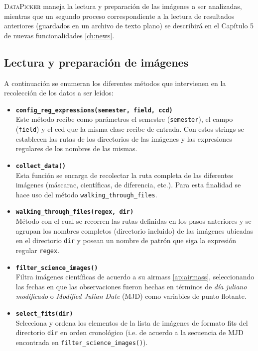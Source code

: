 \textsc{DataPicker} maneja  la lectura y preparaci\'on de las im\'agenes a ser analizadas, mientras que un segundo proceso correspondiente a la lectura de resultados anteriores (guardados en un archivo de texto plano) se describir\'a en el Cap\'itulo 5 de nuevas funcionalidades \ref{ch:news}. 
\bigskip
  
\subsection{Lectura y preparaci\'on de im\'agenes}
A continuaci\'on se enumeran los diferentes m\'etodos que intervienen en la recolecci\'on de los datos a ser le\'idos:

\begin{itemize}
\item \textbf{\texttt{config\_reg\_expressions(semester, field, ccd)}}\\
Este m\'etodo recibe como par\'ametros el semestre (\texttt{semester}), el campo (\texttt{field}) y el ccd que la misma clase recibe de entrada. Con estos strings se establecen las rutas de los directorios de las im\'agenes y las expresiones regulares de los nombres de las mismas.
\bigskip

\item \textbf{\texttt{collect\_data()}}\\
Esta funci\'on se encarga de recolectar la ruta completa de las diferentes im\'agenes (m\'ascarac, cient\'ificas, de diferencia, etc.). Para esta finalidad se hace uso del m\'etodo \texttt{walking\_through\_files}. 
\bigskip

\item \textbf{\texttt{walking\_through\_files(regex, dir)}}\\
M\'etodo con el cual se recorren las rutas definidas en los pasos anteriores y se agrupan los nombres completos (directorio incluido) de las im\'agenes ubicadas en el directorio \texttt{dir} y posean un nombre de patr\'on que siga la expresi\'on regular \texttt{regex}.
\bigskip

\item \textbf{\texttt{filter\_science\_images()}}\\
Filtra im\'agenes cient\'ificas de acuerdo a su airmass \ref{ap:airmass}, seleccionando las fechas en que las observaciones fueron hechas en t\'erminos de \textit{d\'ia juliano modificado} o \textit{Modified Julian Date} (MJD) como variables de punto flotante.
\bigskip

\item \textbf{\texttt{select\_fits(dir)}}\\
Selecciona y ordena los elementos de la lista de im\'agenes de formato fits del directorio \texttt{dir} en orden cronol\'ogico (i.e. de acuerdo a la secuencia de MJD encontrada en \texttt{filter\_science\_images()}).
\bigskip


\end{itemize}
